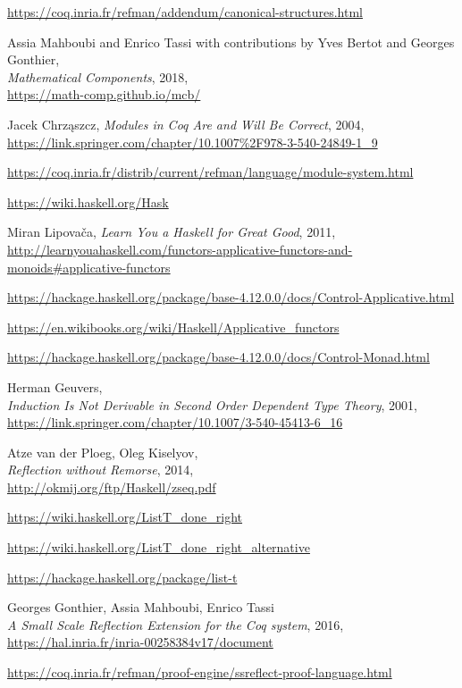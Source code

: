 \documentclass[declaration,inz,english,shortabstract]{iithesis}
\begin{document}
\begin{thebibliography}{1}
        \url{https://coq.inria.fr/refman/addendum/canonical-structures.html}

        Assia Mahboubi and Enrico Tassi with contributions by Yves Bertot and Georges Gonthier, \\
        \textit{Mathematical Components}, 2018, \\
        \url{https://math-comp.github.io/mcb/}

        Jacek Chrząszcz,
        \textit{Modules in Coq Are and Will Be Correct}, 2004, \\
        \url{https://link.springer.com/chapter/10.1007%2F978-3-540-24849-1_9}

        \url{https://coq.inria.fr/distrib/current/refman/language/module-system.html}

        \url{https://wiki.haskell.org/Hask}

        Miran Lipovača,
        \textit{Learn You a Haskell for Great Good}, 2011, \\
        \url{http://learnyouahaskell.com/functors-applicative-functors-and-monoids#applicative-functors}

        \url{https://hackage.haskell.org/package/base-4.12.0.0/docs/Control-Applicative.html}

        \url{https://en.wikibooks.org/wiki/Haskell/Applicative_functors}

        \url{https://hackage.haskell.org/package/base-4.12.0.0/docs/Control-Monad.html}

        Herman Geuvers, \\
        \textit{Induction Is Not Derivable in Second Order Dependent Type Theory}, 2001, \\
        \url{https://link.springer.com/chapter/10.1007/3-540-45413-6_16}

        Atze van der Ploeg, Oleg Kiselyov, \\
        \textit{Reflection without Remorse}, 2014, \\
        \url{http://okmij.org/ftp/Haskell/zseq.pdf}

        \url{https://wiki.haskell.org/ListT_done_right}

        \url{https://wiki.haskell.org/ListT_done_right_alternative}

        \url{https://hackage.haskell.org/package/list-t}

        Georges Gonthier, Assia Mahboubi, Enrico Tassi \\
        \textit{A Small Scale Reflection Extension for the Coq system}, 2016, \\
        \url{https://hal.inria.fr/inria-00258384v17/document}

        \url{https://coq.inria.fr/refman/proof-engine/ssreflect-proof-language.html}
\end{thebibliography}

\end{document}
